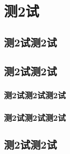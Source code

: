 \chapter{测2试}
\blindtext\cite{NWPUThesisLaTeXTemplate}
\section{测2试测2试}
\blindtext\cite{knuth1986the}\cite{lamport1989latex:}
\section{测2试测2试}
\blindtext
\subsection{测2试测2试测2试}
\blindtext
\subsection{测2试测2试测2试}
\blindtext
\section{测2试测2试}
\blindtext

\endinput